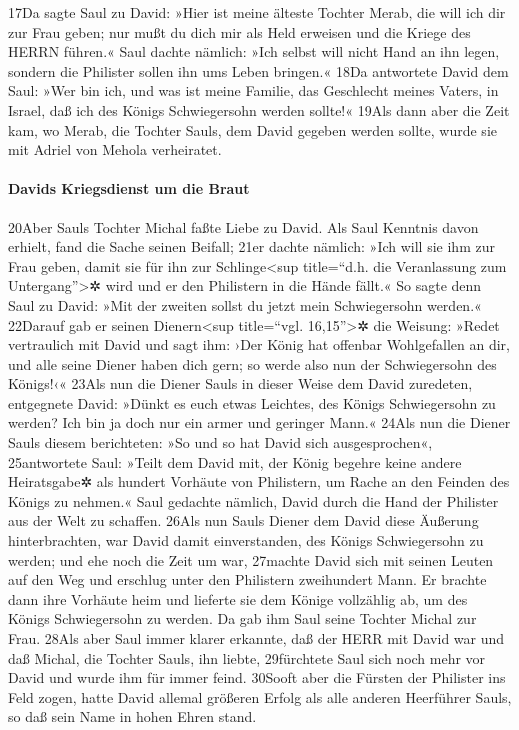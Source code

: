 17Da sagte Saul zu David: »Hier ist meine älteste Tochter Merab, die
will ich dir zur Frau geben; nur mußt du dich mir als Held erweisen und
die Kriege des HERRN führen.« Saul dachte nämlich: »Ich selbst will
nicht Hand an ihn legen, sondern die Philister sollen ihn ums Leben
bringen.« 18Da antwortete David dem Saul: »Wer bin ich, und was ist
meine Familie, das Geschlecht meines Vaters, in Israel, daß ich des
Königs Schwiegersohn werden sollte!« 19Als dann aber die Zeit kam, wo
Merab, die Tochter Sauls, dem David gegeben werden sollte, wurde sie mit
Adriel von Mehola verheiratet.

\hypertarget{davids-kriegsdienst-um-die-braut}{%
\paragraph{Davids Kriegsdienst um die
Braut}\label{davids-kriegsdienst-um-die-braut}}

20Aber Sauls Tochter Michal faßte Liebe zu David. Als Saul Kenntnis
davon erhielt, fand die Sache seinen Beifall; 21er dachte nämlich: »Ich
will sie ihm zur Frau geben, damit sie für ihn zur Schlinge\textless sup
title=``d.h. die Veranlassung zum Untergang''\textgreater✲ wird und er
den Philistern in die Hände fällt.« So sagte denn Saul zu David: »Mit
der zweiten sollst du jetzt mein Schwiegersohn werden.« 22Darauf gab er
seinen Dienern\textless sup title=``vgl. 16,15''\textgreater✲ die
Weisung: »Redet vertraulich mit David und sagt ihm: ›Der König hat
offenbar Wohlgefallen an dir, und alle seine Diener haben dich gern; so
werde also nun der Schwiegersohn des Königs!‹« 23Als nun die Diener
Sauls in dieser Weise dem David zuredeten, entgegnete David: »Dünkt es
euch etwas Leichtes, des Königs Schwiegersohn zu werden? Ich bin ja doch
nur ein armer und geringer Mann.« 24Als nun die Diener Sauls diesem
berichteten: »So und so hat David sich ausgesprochen«, 25antwortete
Saul: »Teilt dem David mit, der König begehre keine andere Heiratsgabe✲
als hundert Vorhäute von Philistern, um Rache an den Feinden des Königs
zu nehmen.« Saul gedachte nämlich, David durch die Hand der Philister
aus der Welt zu schaffen. 26Als nun Sauls Diener dem David diese
Äußerung hinterbrachten, war David damit einverstanden, des Königs
Schwiegersohn zu werden; und ehe noch die Zeit um war, 27machte David
sich mit seinen Leuten auf den Weg und erschlug unter den Philistern
zweihundert Mann. Er brachte dann ihre Vorhäute heim und lieferte sie
dem Könige vollzählig ab, um des Königs Schwiegersohn zu werden. Da gab
ihm Saul seine Tochter Michal zur Frau. 28Als aber Saul immer klarer
erkannte, daß der HERR mit David war und daß Michal, die Tochter Sauls,
ihn liebte, 29fürchtete Saul sich noch mehr vor David und wurde ihm für
immer feind. 30Sooft aber die Fürsten der Philister ins Feld zogen,
hatte David allemal größeren Erfolg als alle anderen Heerführer Sauls,
so daß sein Name in hohen Ehren stand.

